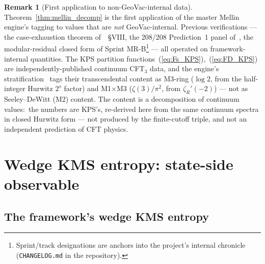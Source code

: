 \documentclass[11pt,a4paper]{article}
\theoremstyle{plain}
\theoremstyle{definition}
\newtheorem{remark}[theorem]{Remark}
\begin{document}
\begin{remark}[First application to non-GeoVac-internal data]
\label{rem:first_external_verification}
Theorem~\ref{thm:mellin_decomp} is the first application of the
master Mellin engine's tagging to values that are \emph{not}
GeoVac-internal. Previous verifications --- the case-exhaustion
theorem of~\cite{paper32}~\S VIII, the 208/208 Prediction~1 panel
of~\cite{paper35}, the modular-residual closed form of Sprint MR-B\footnote{Sprint/track designations are anchors into the project's internal chronicle (\texttt{CHANGELOG.md} in the repository).}
--- all operated on framework-internal quantities. The KPS
partition functions~(\ref{eq:Fs_KPS}),~(\ref{eq:FD_KPS}) are
independently-published continuum CFT$_{3}$ data, and the engine's
stratification~\cite{paper18} tags their transcendental content as
M3-ring ($\log 2$, from the half-integer Hurwitz $2^{s}$ factor) and
M1$\times$M3 ($\zeta(3)/\pi^{2}$, from $\zeta_{R}'(-2)$) --- not as
Seeley--DeWitt (M2) content. The
content is a decomposition of continuum values:\ the numbers are KPS's,
re-derived here from the same continuum spectra in closed Hurwitz form
--- not produced by the finite-cutoff triple, and not an independent
prediction of CFT physics.
\end{remark}

\section{Wedge KMS entropy: state-side observable}
\label{sec:wedge_kms}

\subsection{The framework's wedge KMS entropy}
\end{document}
